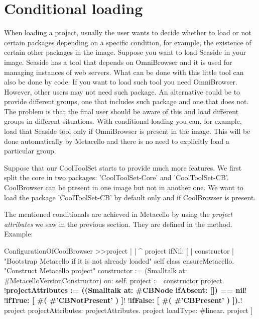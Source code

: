 \documentclass[a4paper,10pt,twoside]{book}
\begin{document}
\section{Conditional loading}
When loading a project, usually the user wants to decide whether to load or not certain packages depending on a specific condition, for example, the existence of certain other packages in the image. Suppose you want to load Seaside in your image. Seaside has a tool that depends on OmniBrowser and it is used for managing instances of web servers. What can be done with this little tool can also be done by code. If you want to load such tool you need OmniBrowser. However, other users may not need such package. An alternative could be to provide different groups, one that includes such package and one that does not. The problem is that the final user should be aware of this and load different groups in different situations.  With conditional loading you can, for example, load that Seaside tool only if OmniBrowser is present in the image. This will be done automatically by Metacello and there is no need to explicitly load a particular group. 

Suppose that our CoolToolSet starts to provide much more features. We first split the core in two packages: 'CoolToolSet-Core' and 'CoolToolSet-CB'. CoolBrowser can be present in one image but not in another one. We want to load the package 'CoolToolSet-CB' by default only and if CoolBrowser is present. 

The mentioned conditionals are achieved in Metacello by using the \emph{project attributes} we saw in the previous section. They are defined in the  method. 
Example:


\begin{code}{}
ConfigurationOfCoolBrowser >>project
       |  | 
       ^ project ifNil: [ | constructor |
              "Bootstrap Metacello if it is not already loaded"
              self class ensureMetacello.
              "Construct Metacello project"
              constructor := (Smalltalk at: #MetacelloVersionConstructor) on: self.
              project := constructor project.
              !\textbf{projectAttributes :=  ((Smalltalk at: \#CBNode ifAbsent: []) == nil}!
                    !\textbf{ifTrue: [ \#( \#'CBNotPresent' ) ]}!
                    !\textbf{ifFalse: [ \#( \#'CBPresent' ) ]).}!              
              project projectAttributes:  projectAttributes.
              project loadType: #linear.
              project ]

\end{code}
\end{document}
